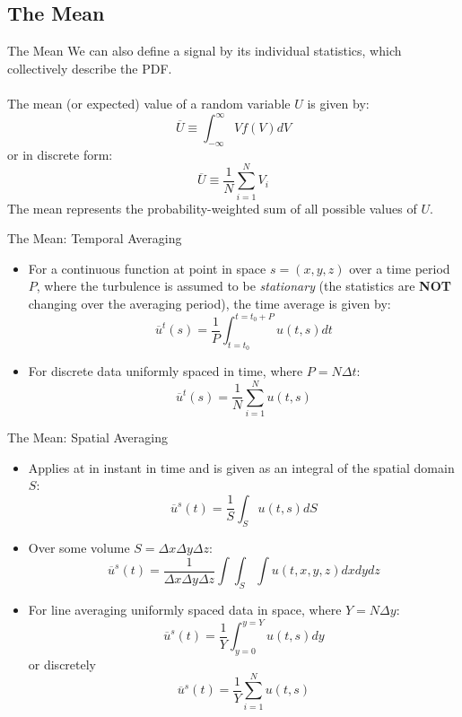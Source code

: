\subsection{The Mean}
\begin{frame}{The Mean}
We can also define a signal by its individual statistics, which collectively describe the PDF.
~\\~\\
The mean (or expected) value of a random variable $U$ is given by:
$$\overline{U} \equiv \int^{\infty}_{-\infty} Vf(V)dV$$
or in discrete form:
$$\overline{U} \equiv \frac{1}{N} \sum^N_{i=1} V_i$$
The mean represents the probability-weighted sum of all possible values of $U$.
\end{frame}

\begin{frame}{The Mean: Temporal Averaging}

\begin{itemize}
	\item For a continuous function at point in space $s=(x,y,z)$ over a time period $P$, where the turbulence is assumed to be \textit{stationary} (the statistics are \textbf{NOT} changing over the averaging period), the time average is given by: $$\overline{u}^t(s) = \frac{1}{P} \int^{t=t_0+P}_{t=t_0} u(t,s) dt$$
	\item For discrete data uniformly spaced in time, where $P=N\Delta t$: $$\overline{u}^t(s)=\frac{1}{N} \sum^{N}_{i=1} u(t,s)$$
\end{itemize}

\end{frame}


\begin{frame}{The Mean: Spatial Averaging}

\begin{itemize}
	\item Applies at in instant in time and is given as an integral of the spatial domain $S$:
	$$\overline{u}^s(t) = \frac{1}{S} \int_{S} u(t,s) dS$$
	\item Over some volume $S=\Delta x \Delta y \Delta z$:
	$$\overline{u}^s(t) = \frac{1}{\Delta x \Delta y \Delta z} \int \int_{S} \int u(t,x,y,z) dx dy dz$$
	\item For line averaging uniformly spaced data in space, where $Y=N\Delta y$:
	$$\overline{u}^s(t) = \frac{1}{Y} \int^{y=Y}_{y=0} u(t,s) dy$$
	or discretely
	$$\overline{u}^s(t) = \frac{1}{Y}\sum^{N}_{i=1} u(t,s)$$
\end{itemize}

\end{frame}


